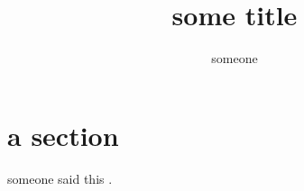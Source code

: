 \title{some title}
\author{someone}



\maketitle

\section{a section}

someone said this \parencite{gupte2018,abrahms2017}.


\printbibliography


